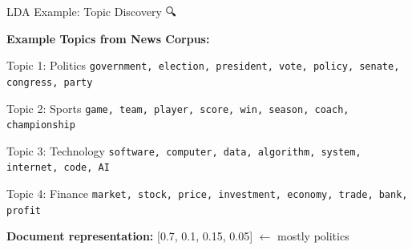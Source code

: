\documentclass[aspectratio=169]{beamer}
\begin{document}
\begin{frame}{LDA Example: Topic Discovery 🔍}
\begin{center}
\textbf{Example Topics from News Corpus:}
\end{center}

\vspace{1em}

\begin{block}{Topic 1: Politics}
\texttt{government, election, president, vote, policy, senate, congress, party}
\end{block}

\begin{block}{Topic 2: Sports}
\texttt{game, team, player, score, win, season, coach, championship}
\end{block}

\begin{block}{Topic 3: Technology}
\texttt{software, computer, data, algorithm, system, internet, code, AI}
\end{block}

\begin{block}{Topic 4: Finance}
\texttt{market, stock, price, investment, economy, trade, bank, profit}
\end{block}

\vspace{0.5em}
\textbf{Document representation:} [0.7, 0.1, 0.15, 0.05] $\leftarrow$ mostly politics
\end{frame}
\end{document}

